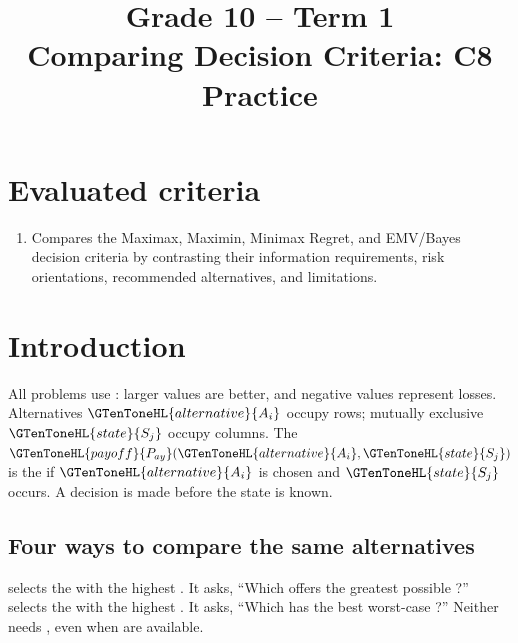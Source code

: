 \makeatletter
{}
\makeatother





\title{Grade 10 -- Term 1\\Comparing Decision Criteria: C8 Practice}
\author{}
\date{}


\maketitle
\setcounter{tocdepth}{1}
\setcounter{secnumdepth}{2}
\label{toc}
\tableofcontents

\section*{Evaluated criteria}
\begin{enumerate}[label=\textbf{C\arabic*},start=8]
\item Compares the Maximax, Maximin, Minimax Regret, and EMV/Bayes decision criteria by contrasting their information requirements, risk orientations, recommended alternatives, and limitations.
\end{enumerate}

\section{Introduction}\label{sec:c8-introduction}
\label{tone:legend}

All problems use \textbf{ }: larger values are better, and negative values represent losses. Alternatives $\GTenToneHL{alternative}{A_i}$ occupy rows; mutually exclusive    $\GTenToneHL{state}{S_j}$ occupy columns. The  $\GTenToneHL{payoff}{P_{ay}}(\GTenToneHL{alternative}{A_i},\GTenToneHL{state}{S_j})$ is the  if $\GTenToneHL{alternative}{A_i}$ is chosen and $\GTenToneHL{state}{S_j}$ occurs. A decision is made before the state is known.

\subsection{Four ways to compare the same alternatives}
\textbf{} selects the  with the highest  . It asks, ``Which  offers the greatest possible ?'' \textbf{} selects the  with the highest  . It asks, ``Which  has the best worst-case ?'' Neither needs , even when  are available.

